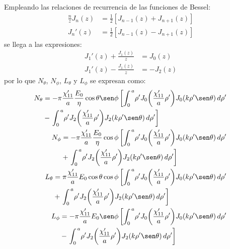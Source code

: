 Empleando las relaciones de recurrencia de las funciones de Bessel:
\begin{align}
\frac{n}{z}J_n\!\left(z\right) &= \frac{1}{2}\left[J_{n - 1}\!\left(z\right) + J_{n + 1}\!\left(z\right)\right]
\label{ec_apC:85}\\
{J_n}'\!\left(z\right) &= \frac{1}{2}\left[J_{n - 1}\!\left(z\right) - J_{n + 1}\!\left(z\right)\right]
\label{ec_apC:86}
\end{align}
se llega a las expresiones:
\begin{align}
{J_1}'\!\left(z\right) + \frac{J_1\!\left(z\right)}{z} &= J_0\!\left(z\right)
\label{ec_apC:87}\\
{J_1}'\!\left(z\right) - \frac{J_1\!\left(z\right)}{z} &= -J_2\!\left(z\right)
\label{ec_apC:88}
\end{align}
por lo que $N_{\theta}$, $N_{\phi}$, $L_{\theta}$ y $L_{\phi}$ se expresan como:
\begin{subequations}
\label{grup_ec_apC:20}
\begin{align}
\begin{split}
N_{\theta} &= - \pi\frac{\chi '_{11}}{a}\dfrac{E_0}{\eta}\cos\theta\sen\phi\left[\int_{0}^{\,a}\!\rho 'J_0\!\left(\frac{\chi '_{11}}{a}\rho '\right)\!J_0\!\left(k\rho '\sen\theta\right)d\rho '\right.\\
&-\left.\int_{0}^{\,a}\!\rho 'J_2\!\left(\frac{\chi '_{11}}{a}\rho '\right)\!J_2\!\left(k\rho '\sen\theta\right)d\rho '\right]
\end{split}
\label{ec_apC:89}\\
\begin{split}
N_{\phi} &= - \pi\frac{\chi '_{11}}{a}\dfrac{E_0}{\eta}\cos\phi\left[\int_{0}^{\,a}\!\rho 'J_0\!\left(\frac{\chi '_{11}}{a}\rho '\right)\!J_0\!\left(k\rho '\sen\theta\right)d\rho '\right.\\
&+\left.\int_{0}^{\,a}\!\rho 'J_2\!\left(\frac{\chi '_{11}}{a}\rho '\right)\!J_2\!\left(k\rho '\sen\theta\right)d\rho '\right]
\end{split}
\label{ec_apC:90}\\
\begin{split}
L_{\theta} &= \pi\frac{\chi '_{11}}{a}E_0\cos\theta\cos\phi\left[\int_{0}^{\,a}\!\rho 'J_0\!\left(\frac{\chi '_{11}}{a}\rho '\right)\!J_0\!\left(k\rho '\sen\theta\right)d\rho '\right.\\
&+\left.\int_{0}^{\,a}\!\rho 'J_2\!\left(\frac{\chi '_{11}}{a}\rho '\right)\!J_2\!\left(k\rho '\sen\theta\right)d\rho '\right]
\end{split}
\label{ec_apC:91}\\
\begin{split}
L_{\phi} &= - \pi\frac{\chi '_{11}}{a}E_0\sen\phi\left[\int_{0}^{\,a}\!\rho 'J_0\!\left(\frac{\chi '_{11}}{a}\rho '\right)\!J_0\!\left(k\rho '\sen\theta\right)d\rho '\right.\\
&-\left.\int_{0}^{\,a}\!\rho 'J_2\!\left(\frac{\chi '_{11}}{a}\rho '\right)\!J_2\!\left(k\rho '\sen\theta\right)d\rho '\right]
\end{split}
\label{ec_apC:92}
\end{align}
\end{subequations}
